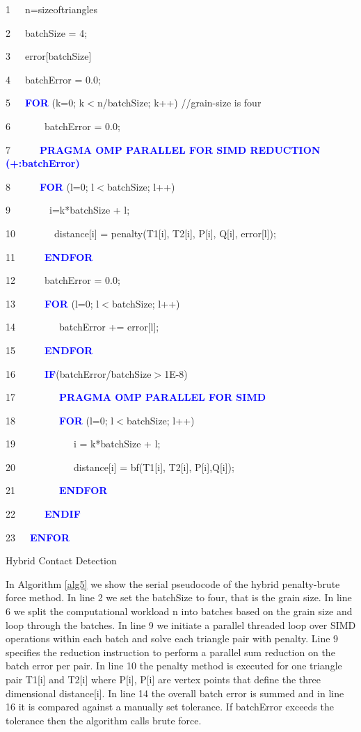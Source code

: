 \documentclass[times,12pt]{article}
\begin{document}
\begin{algorithm}	

1~~~n=sizeoftriangles      

2~~~batchSize = 4;

3~~~error[batchSize]

4~~~batchError = 0.0;

5~~~\textbf{\textcolor{blue}{FOR}} (k=0; k$<$n/batchSize; k++) //grain-size is four

6~~~~~~~batchError = 0.0;

7~~~~~~\textbf{\textcolor{blue}{PRAGMA OMP PARALLEL FOR SIMD REDUCTION (+:batchError)}}

8~~~~~~\textbf{\textcolor{blue}{FOR}} (l=0; l$<$batchSize; l++) 

9~~~~~~~~i=k*batchSize + l;

10~~~~~~~~distance[i] = penalty(T1[i], T2[i], P[i], Q[i], error[l]);

11~~~~~~\textbf{\textcolor{blue}{ENDFOR}}

12~~~~~~batchError = 0.0;

13~~~~~~\textbf{\textcolor{blue}{FOR}} (l=0; l$<$batchSize; l++) 

14~~~~~~~~~batchError += error[l];

15~~~~~~\textbf{\textcolor{blue}{ENDFOR}}

16~~~~~~\textbf{\textcolor{blue}{IF}}(batchError/batchSize$>$1E-8)

17~~~~~~~~~\textbf{\textcolor{blue}{PRAGMA OMP PARALLEL FOR SIMD}}

18~~~~~~~~~\textbf{\textcolor{blue}{FOR}} (l=0; l$<$batchSize; l++)

19~~~~~~~~~~~~i = k*batchSize + l;

20~~~~~~~~~~~~distance[i] = bf(T1[i], T2[i], P[i],Q[i]);

21~~~~~~~~~\textbf{\textcolor{blue}{ENDFOR}}

22~~~~~~\textbf{\textcolor{blue}{ENDIF}}

23~~~\textbf{\textcolor{blue}{ENFOR}}

\protect\caption{\label{alg5}Hybrid Contact Detection}
\end{algorithm}

In Algorithm \ref{alg5} we show the serial pseudocode of the hybrid penalty-brute force method. In line 2 we set the batchSize to four, that is the grain size. In line 6 we split the computational workload n into batches based on the grain size and loop through the batches. In line 9 we initiate a parallel threaded loop over SIMD operations within each batch and solve each triangle pair with penalty. Line 9 specifies the reduction instruction to perform a parallel sum reduction on the batch error per pair. In line 10 the penalty method is executed for one triangle pair T1[i] and T2[i] where P[i], P[i] are vertex points that define the three dimensional distance[i]. In line 14 the overall batch error is summed and in line 16 it is compared against a manually set tolerance. If batchError exceeds the tolerance then the algorithm calls brute force.
\end{document}
